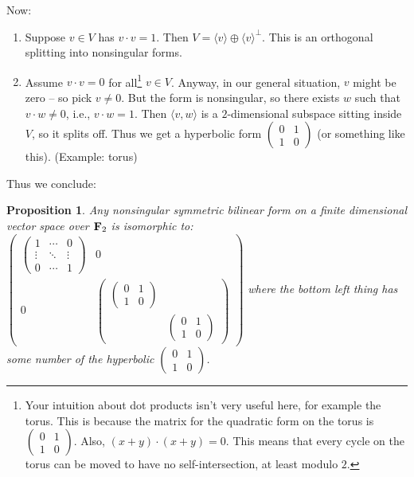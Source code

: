\documentclass{amsart}
\theoremstyle{theorem}
\newtheorem{prop}[theorem]{Proposition}
\theoremstyle{definition}
\begin{document}
Now:
\begin{enumerate}
\item Suppose $v\in V$ has $v\cdot v=1$. Then $V=\langle v\rangle\oplus\langle v\rangle^\perp$. This is an orthogonal splitting into nonsingular forms.
\item Assume $v\cdot v=0$ for all\footnote{Your intuition about dot products isn't very useful here, for example the torus. This is because the matrix for the quadratic form on the torus is $\begin{pmatrix}0 & 1 \\ 1 & 0\end{pmatrix}$. Also, $(x+y)\cdot(x+y)=0$. This means that every cycle on the torus can be moved to have no self-intersection, at least modulo $2$.} $v\in V$. Anyway, in our general situation, $v$ might be zero -- so pick $v\neq 0$. But the form is nonsingular, so there exists $w$ such that $v\cdot w\neq 0$, i.e., $v\cdot w=1$. Then $\langle v,w\rangle$ is a $2$-dimensional subspace sitting inside $V$, so it splits off. Thus we get a hyperbolic form $\begin{pmatrix}0 & 1 \\ 1 & 0\end{pmatrix}$ (or something like this). (Example: torus)
\end{enumerate}
Thus we conclude:
\begin{prop}
Any nonsingular symmetric bilinear form on a finite dimensional vector space over $\mathbf F_2$ is isomorphic to: $\begin{pmatrix}\begin{pmatrix}1 & \cdots & 0\\ \vdots & \ddots & \vdots \\ 0 & \cdots & 1 \end{pmatrix} & 0 \\ 0 & \begin{pmatrix}\begin{pmatrix}0 & 1 \\ 1 & 0\end{pmatrix} & \\ & \begin{pmatrix}0 & 1 \\ 1 & 0\end{pmatrix}\end{pmatrix}\end{pmatrix}$ where the bottom left thing has some number of the hyperbolic $\begin{pmatrix}0 & 1 \\ 1 & 0\end{pmatrix}$.
\end{prop}
\end{document}
